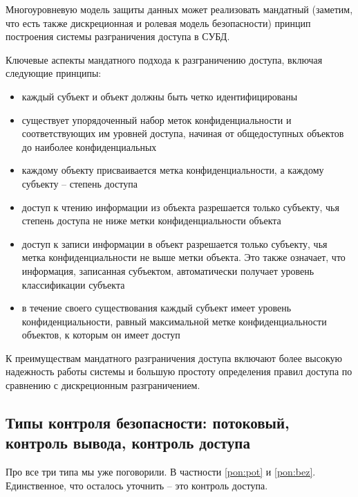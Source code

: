 Многоуровневую модель защиты данных может реализовать мандатный (заметим, что есть также дискреционная и ролевая модель безопасности) принцип построения системы разграничения доступа в СУБД.

Ключевые аспекты мандатного подхода к разграничению доступа, включая следующие принципы:
\begin{itemize}
	\item каждый субъект и объект должны быть четко идентифицированы
	\item существует упорядоченный набор меток конфиденциальности и соответствующих им уровней доступа, начиная от общедоступных объектов до наиболее конфиденциальных
	\item каждому объекту присваивается метка конфиденциальности, а каждому субъекту – степень доступа
	\item доступ к чтению информации из объекта разрешается только субъекту, чья степень доступа не ниже метки конфиденциальности объекта
	\item доступ к записи информации в объект разрешается только субъекту, чья метка конфиденциальности не выше метки объекта. Это также означает, что информация, записанная субъектом, автоматически получает уровень классификации субъекта
	\item в течение своего существования каждый субъект имеет уровень конфиденциальности, равный максимальной метке конфиденциальности объектов, к которым он имеет доступ
\end{itemize}

К преимуществам мандатного разграничения доступа включают более высокую надежность работы системы и большую простоту определения правил доступа по сравнению с дискреционным разграничением.

\subsection{Типы контроля безопасности: потоковый, контроль вывода, контроль доступа}
Про все три типа мы уже поговорили. В частности \ref{pon:pot} и \ref{pon:bez}. Единственное, что осталось уточнить -- это контроль доступа. 

